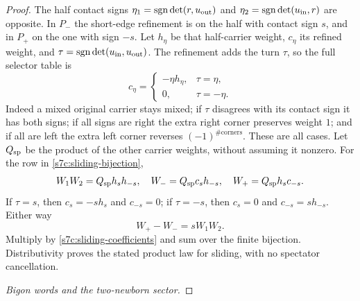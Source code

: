 \begin{proof}
The half contact signs
$\eta_1=\operatorname{sgn}\det(r,u_{\rm out})$ and
$\eta_2=\operatorname{sgn}\det(u_{\rm in},r)$ are opposite.  In $P_-$ the
short-edge refinement is on the half with contact sign $s$, and in $P_+$
on the one with sign $-s$.  Let $h_\eta$ be that half-carrier weight,
$c_\eta$ its refined weight, and
$\tau=\operatorname{sgn}\det(u_{\rm in},u_{\rm out})$.  The refinement adds
the turn $\tau$, so the full selector table is
\begin{equation}\label{s7c:short-selector}
 c_\eta=\begin{cases}
 -\eta h_\eta,&\tau=\eta,\\
 0,&\tau=-\eta.
 \end{cases}
\end{equation}
Indeed a mixed original carrier stays mixed; if $\tau$ disagrees with
its contact sign it has both signs; if all signs are right the extra
right corner preserves weight $1$; and if all are left the extra left
corner reverses $(-1)^{\#\text{corners}}$.  These are all cases.
Let $Q_{\rm sp}$ be the product of the other carrier weights, without
assuming it nonzero.  For the row in \eqref{s7c:sliding-bijection},
\begin{equation}\label{s7c:sliding-selector-factors}
 W_1W_2=Q_{\rm sp}h_s h_{-s},\quad
 W_-=Q_{\rm sp}c_s h_{-s},\quad
 W_+=Q_{\rm sp}h_s c_{-s}.
\end{equation}
If $\tau=s$, then $c_s=-s h_s$ and $c_{-s}=0$; if $\tau=-s$,
then $c_s=0$ and $c_{-s}=s h_{-s}$.  Either way
\begin{equation}\label{s7c:sliding-selector-difference}
 W_+-W_-=sW_1W_2.
\end{equation}
Multiply by \eqref{s7c:sliding-coefficients} and sum over the finite
bijection.  Distributivity proves the stated product law for sliding,
with no spectator cancellation.

\par\medskip\noindent\emph{Bigon words and the two-newborn sector.}\par


\end{proof}
